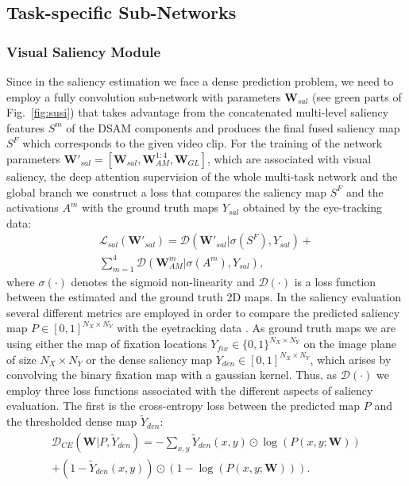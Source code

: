 \documentclass[10pt,twocolumn,letterpaper]{article}
\begin{document}
\subsection{Task-specific Sub-Networks}

\subsubsection{Visual Saliency Module}
Since in the saliency estimation we face a dense prediction problem, we need to employ a fully convolution sub-network with parameters $\mathbf{W}_{sal}$ (see green parts of Fig.~\ref{fig:susi}) that takes advantage from the concatenated multi-level saliency features $S^m$ of the DSAM components and  produces the final fused saliency map $S^F$ which corresponds to the given video clip. For the training of the network parameters $\mathbf{W'}_{sal}=[\mathbf{W}_{sal}, \mathbf{W}_{AM}^{1:4}, \mathbf{W}_{GL}]$, which are associated with visual saliency, the deep attention supervision of the whole multi-task network and the global branch we construct a loss that compares the saliency map $S^F$ and the activations $A^m$ with the ground truth maps $Y_{sal}$ obtained by the eye-tracking data:
\begin{equation}
\begin{split}
\mathcal{L}_{sal}(\mathbf{W'}_{sal}) = \mathcal{D}(\mathbf{W'}_{sal} | \sigma(S^F),Y_{sal}) + \\ 
\sum_{m=1}^4 \mathcal{D}(\mathbf{W}_{AM}^m | \sigma(A^m),Y_{sal}), \label{sal_loss_gen}
\end{split}
\end{equation}
where $\sigma(\cdot)$ denotes the sigmoid non-linearity and $\mathcal{D}(\cdot)$ is a loss function between the estimated and the ground truth 2D maps. In the saliency evaluation several different metrics are employed in order to compare the predicted saliency map $P \in [0,1]^{N_X \times N_Y}$ with the eyetracking data \cite{bylinskii2016different}. As ground truth maps we are using either the map of fixation locations $Y_{fix} \in \{0,1\}^{N_X \times N_Y}$ on the image plane of size $N_X \times N_Y$ or the dense saliency map $Y_{den}\in[0,1]^{N_X \times N_Y}$, which arises by convolving the binary fixation map with a gaussian kernel. Thus, as $\mathcal{D}(\cdot)$ we employ three loss functions associated with the different aspects of saliency evaluation. The first is the cross-entropy loss between the predicted map $P$ and the thresholded dense map $\tilde{Y}_{den}$:
\begin{equation}
\begin{split}
\mathcal{D}_{CE}(\mathbf{W}|P,\tilde{Y}_{den})= - \sum_{x,y} \tilde{Y}_{den}(x,y) \odot \log(P(x,y;\mathbf{W})) \\
+ (1-\tilde{Y}_{den}(x,y)) \odot (1-\log(P(x,y;\mathbf{W}))).
\end{split}
\end{equation}
\end{document}
